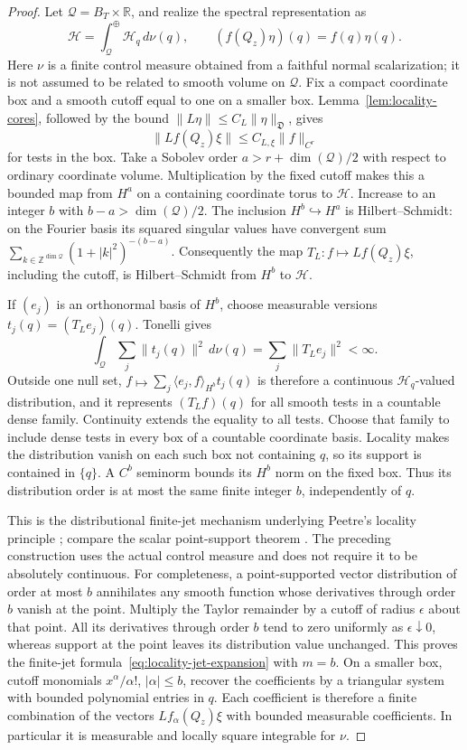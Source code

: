 \begin{proof}
Let $\mathcal Q=B_T\times\mathbb R$, and realize the spectral representation as
\[
 \mathcal H=\int_{\mathcal Q}^{\oplus}\mathcal H_q\,d\nu(q),
 \qquad (f(Q_z)\eta)(q)=f(q)\eta(q).
\]
Here $\nu$ is a finite control measure obtained from a faithful normal
scalarization; it is not assumed to be related to smooth volume on $\mathcal Q$.
Fix a compact coordinate box and a smooth cutoff equal to one on a
smaller box. Lemma~\ref{lem:locality-cores}, followed by the bound
$\|L\eta\|\le C_L\|\eta\|_{\mathfrak D}$, gives
\[
 \|Lf(Q_z)\xi\|\le C_{L,\xi}\|f\|_{C^r}
\]
for tests in the box. Take a Sobolev order $a>r+\dim(\mathcal Q)/2$ with
respect to ordinary coordinate volume. Multiplication by the fixed cutoff
makes this a bounded map from $H^a$ on a containing coordinate torus to
$\mathcal H$. Increase to an integer $b$ with $b-a>\dim(\mathcal Q)/2$.
The inclusion $H^b\hookrightarrow H^a$ is Hilbert--Schmidt: on the
Fourier basis its squared singular values have convergent sum
$\sum_{k\in\mathbb Z^{\dim\mathcal Q}}(1+|k|^2)^{-(b-a)}$.
Consequently the map $T_L:f\mapsto Lf(Q_z)\xi$, including the cutoff,
is Hilbert--Schmidt from $H^b$ to $\mathcal H$.

If $(e_j)$ is an orthonormal basis of $H^b$, choose measurable versions
$t_j(q)=(T_Le_j)(q)$. Tonelli gives
\[
 \int_{\mathcal Q}\sum_j\|t_j(q)\|^2\,d\nu(q)
     =\sum_j\|T_Le_j\|^2<\infty.
\]
Outside one null set, $f\mapsto\sum_j\langle e_j,f\rangle_{H^b}t_j(q)$
is therefore a continuous $\mathcal H_q$-valued distribution, and it
represents $(T_Lf)(q)$ for all smooth tests in a countable dense family.
Continuity extends the equality to all tests. Choose that family to
include dense tests in every box of a countable coordinate basis.
Locality makes the distribution vanish on each such box not containing
$q$, so its support is contained in $\{q\}$. A $C^b$ seminorm bounds
its $H^b$ norm on the fixed box. Thus its distribution order is at most
the same finite integer $b$, independently of $q$.

This is the distributional finite-jet mechanism underlying Peetre's
locality principle \cite{Peetre1959,Peetre1960}; compare the scalar
point-support theorem \cite[Theorems~2.3.3--2.3.4]{Hormander2003}.
The preceding construction uses the actual control measure and does
not require it to be absolutely continuous. For completeness, a
point-supported vector distribution of order at most
$b$ annihilates any smooth function whose derivatives through order $b$
vanish at the point. Multiply the Taylor remainder by a cutoff of radius
$\epsilon$ about that point. All its derivatives through order $b$ tend
to zero uniformly as $\epsilon\downarrow0$, whereas support at the point
leaves its distribution value unchanged. This proves the finite-jet
formula~\eqref{eq:locality-jet-expansion} with $m=b$. On a smaller box,
cutoff monomials $x^\alpha/\alpha!$, $|\alpha|\le b$, recover the
coefficients by a triangular system with bounded polynomial entries in
$q$. Each coefficient is therefore a finite combination of the vectors
$L f_\alpha(Q_z)\xi$ with bounded measurable coefficients. In particular
it is measurable and locally square integrable for $\nu$.


\end{proof}
